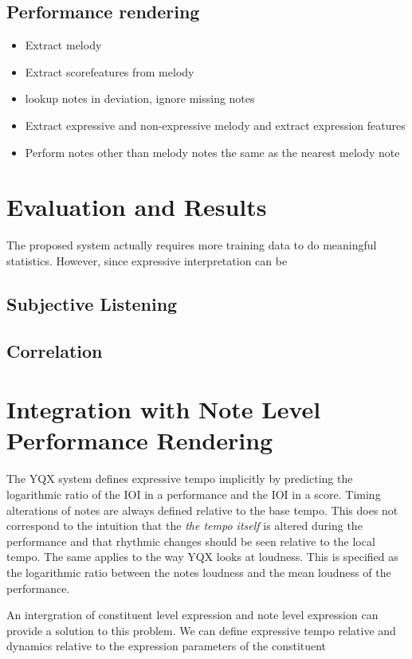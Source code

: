 \documentclass[a4paper,10pt]{article}
\begin{document}
\subsection{Performance rendering}
\begin{itemize}
\item Extract melody
\item Extract scorefeatures from melody
\item lookup notes in deviation, ignore missing notes
\item Extract expressive and non-expressive melody and extract expression features
\item Perform notes other than melody notes the same as the nearest melody note
\end{itemize}

\section{Evaluation and Results}
The proposed system actually requires more training data to do meaningful statistics. However, since expressive interpretation can be 
\subsection{Subjective Listening}
\subsection{Correlation}
\section{Integration with Note Level Performance Rendering}

The YQX system defines expressive tempo implicitly by predicting the logarithmic ratio of the IOI in a performance and the IOI in a score. Timing alterations of notes are always defined relative to the base tempo. This does not correspond to the intuition that the \textit{the tempo itself} is altered during the performance and that rhythmic changes should be seen relative to the local tempo. The same applies to the way YQX looks at loudness. This is specified as the logarithmic ratio between the notes loudness and the mean loudness of the performance. 

An intergration of constituent level expression and note level expression can provide a solution to this problem. We can define expressive tempo relative and dynamics relative to the expression parameters of the constituent
\end{document}
